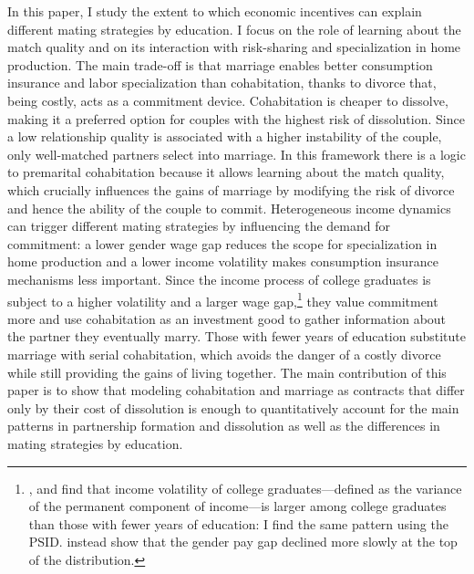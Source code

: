 \documentclass[12pt]{article}
\begin{document}
In this paper, I study the extent to which economic incentives can explain different mating strategies by education. I focus on the role of learning about the match quality and on its interaction with risk-sharing and specialization in home production. The main trade-off is that marriage enables better consumption insurance and labor specialization than cohabitation, thanks to divorce that, being costly, acts as a commitment device. Cohabitation is cheaper to dissolve, making it a preferred option for couples with the highest risk of dissolution. Since a low relationship quality is associated with a higher instability of the couple, only well-matched partners select into marriage. In this framework there is a logic to premarital cohabitation because it allows learning about the match quality, which crucially influences the gains of marriage by modifying the risk of divorce and hence the ability of the couple to commit. Heterogeneous income dynamics can trigger different mating strategies by influencing the demand for commitment: a lower gender wage gap reduces the scope for specialization in home production and a lower income volatility makes consumption insurance mechanisms less important. Since the income process of college graduates is subject to a higher volatility and a larger wage gap,\footnote{\cite{blundell2008}, \cite{meghir2004} and \cite{hong2019} find that income volatility of college graduates---defined as the variance of the permanent component of income---is larger among college graduates than those with fewer years of education: I find the same pattern using the PSID. \cite{cortes2019} instead show that the gender pay gap declined more slowly at the top of the distribution.} they value commitment more and use cohabitation as an investment good to gather information about the partner they eventually marry. Those with fewer years of education substitute marriage with serial cohabitation, which avoids the danger of a costly divorce while still providing the gains of living together. The main contribution of this paper is to show that modeling cohabitation and marriage as contracts that differ only by their cost of dissolution is enough to quantitatively account for the main patterns in partnership formation and dissolution as well as the differences in mating strategies by education.
\end{document}
